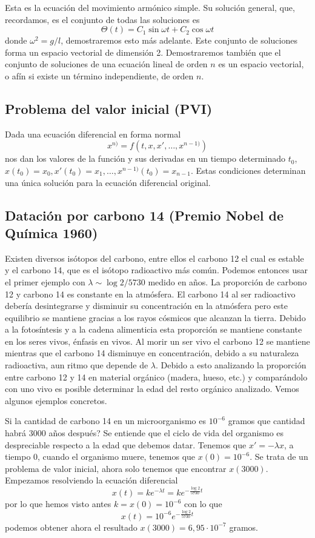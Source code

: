 \documentclass[../main.tex]{subfiles}
\begin{document}
Esta es la ecuación del movimiento armónico simple. Su solución general, que, 
recordamos, es el conjunto de todas las soluciones es
\[\Theta(t) = C_1 \sin \omega t + C_2 \cos \omega t\]
donde \(\omega^2 = g/l\), demostraremos esto más adelante. Este conjunto de
soluciones forma un espacio vectorial de dimensión 2. Demostraremos también que
el conjunto de soluciones de una ecuación lineal de orden \(n\) es un espacio
vectorial, o afín si existe un término independiente, de orden \(n\).

\subsection{Problema del valor inicial (PVI)}

Dada una ecuación diferencial en forma normal
\[x^{n)} = f(t, x, x', \dots, x^{n - 1)})\]
nos dan los valores de la función y sus derivadas en un tiempo determinado
\(t_0\), \(x(t_0) = x_0, x'(t_0) = x_1, \dots, x^{n - 1)}(t_0) = x_{n - 1}\).
Estas condiciones determinan una única solución para la ecuación diferencial
original.

\subsection{Datación por carbono 14 (Premio Nobel de Química 1960)}

Existen diversos isótopos del carbono, entre ellos el carbono 12 el cual es
estable y el carbono 14, que es el isótopo radioactivo más común. Podemos
entonces usar el primer ejemplo con \(\lambda \sim \log 2 / 5730\) medido en
años. La proporción de carbono 12 y carbono 14 es constante en la atmósfera. El
carbono 14 al ser radioactivo debería desintegrarse y disminuir su concentración
en la atmósfera pero este equilibrio se mantiene gracias a los rayos cósmicos
que alcanzan la tierra. Debido a la fotosíntesis y a la cadena alimenticia esta
proporción se mantiene constante en los seres vivos, énfasis en vivos. Al morir
un ser vivo el carbono 12 se mantiene mientras que el carbono 14 disminuye en
concentración, debido a su naturaleza radioactiva, aun ritmo que depende de
\(\lambda\). Debido a esto analizando la proporción entre carbono 12 y 14 en
material orgánico (madera, hueso, etc.) y comparándolo con uno vivo es posible
determinar la edad del resto orgánico analizado. Vemos algunos ejemplos
concretos.

Si la cantidad de carbono 14 en un microorganismo es \(10^{-6}\) gramos que
cantidad habrá 3000 años después? Se entiende que el ciclo de vida del organismo
es despreciable respecto a la edad que debemos datar. Tenemos que 
\(x' = -\lambda x\), a tiempo \(0\), cuando el organismo muere, tenemos que
\(x(0) = 10^{-6}\). Se trata de un problema de valor inicial, ahora solo tenemos
que encontrar \(x(3000)\). Empezamos resolviendo la ecuación diferencial
\[x(t) = k e^{-\lambda t} = k e^{-\frac{\log 2}{5730} t}\]
por lo que hemos visto antes \(k = x(0) = 10^{-6}\) con lo que
\[x(t) = 10^{-6} e^{-\frac{\log 2}{5730} t}\]
podemos obtener ahora el resultado \(x(3000) = 6,95 \cdot 10^{-7}\) gramos.
\end{document}
